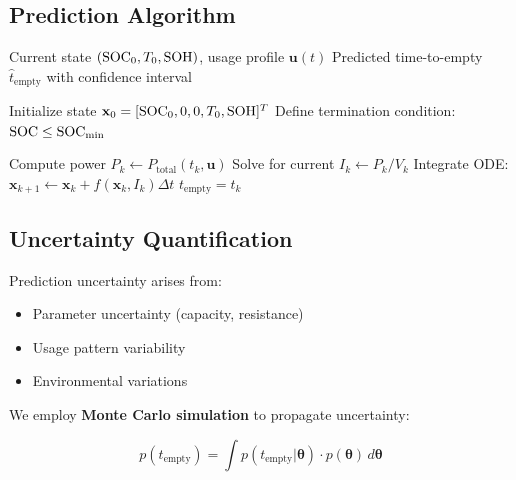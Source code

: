 \subsection{Prediction Algorithm}
\label{subsec:prediction_algorithm}

\begin{algorithm}[H]
    \caption{Time-to-Empty Prediction}
    \label{alg:tte}
    \begin{algorithmic}[1]
        \Require Current state $(\text{SOC}_0, T_0, \text{SOH})$, usage profile $\mathbf{u}(t)$
        \Ensure Predicted time-to-empty $\hat{t}_{\text{empty}}$ with confidence interval
        
        \State Initialize state $\mathbf{x}_0 = [\text{SOC}_0, 0, 0, T_0, \text{SOH}]^T$
        \State Define termination condition: $\text{SOC} \leq \text{SOC}_{\min}$
        
            \State Compute power $P_k \gets P_{\text{total}}(t_k, \mathbf{u})$
            \State Solve for current $I_k \gets P_k / V_k$
            \State Integrate ODE: $\mathbf{x}_{k+1} \gets \mathbf{x}_k + f(\mathbf{x}_k, I_k) \Delta t$
                \State \Return $t_{\text{empty}} = t_k$
            \EndIf
        \EndFor
    \end{algorithmic}
\end{algorithm}

\subsection{Uncertainty Quantification}
\label{subsec:uncertainty}

Prediction uncertainty arises from:
\begin{itemize}
    \item Parameter uncertainty (capacity, resistance)
    \item Usage pattern variability
    \item Environmental variations
\end{itemize}

We employ \textbf{Monte Carlo simulation} to propagate uncertainty:

\begin{equation}
    p(t_{\text{empty}}) = \int p(t_{\text{empty}} | \boldsymbol{\theta}) \cdot p(\boldsymbol{\theta}) \, d\boldsymbol{\theta}
    \label{eq:mc_propagation}
\end{equation}

